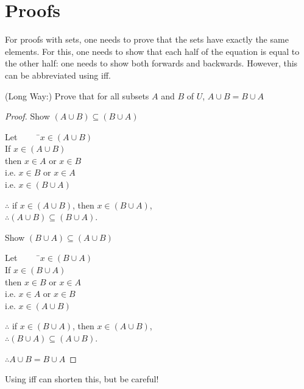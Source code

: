 \documentclass[../notes.tex]{subfiles}
\begin{document}
		\section{Proofs}
			For proofs with sets, one needs to prove that the sets have exactly the same elements. For this, one needs to show that each half of the equation is equal to the other half: one needs to show both forwards and backwards. However, this can be abbreviated using iff.
			\begin{examplebox}
				(Long Way:) Prove that for all subsets $A$ and $B$ of $U$, $A \cup B = B \cup A$
				\begin{proof}
					Show $(A \cup B) \subseteq (B \cup A)$
					\begin{tabbing}
						Let $\qquad$ \=$x \in (A \cup B)$\\
						If \>$x \in (A \cup B)$\\
						then \> $x \in A$ or $x \in B$\\
						i.e. \> $x \in B$ or $x \in A$\\
						i.e. \> $x \in (B \cup A)$
					\end{tabbing}
					$\therefore$ if $x \in (A \cup B)$, then $x \in (B \cup A)$,\\
					$\therefore (A \cup B) \subseteq (B \cup A)$.

					\vspace{7mm}
					Show $(B \cup A) \subseteq (A \cup B)$
					\begin{tabbing}
						Let $\qquad$ \=$x \in (B \cup A)$\\
						If \>$x \in (B \cup A)$\\
						then \> $x \in B$ or $x \in A$\\
						i.e. \> $x \in A$ or $x \in B$\\
						i.e. \> $x \in (A \cup B)$
					\end{tabbing}
					$\therefore$ if $x \in (B \cup A)$, then $x \in (A \cup B)$,\\
					$\therefore (B \cup A) \subseteq (A \cup B)$.
					
					\vspace{5mm}
					$\therefore A \cup B = B \cup A$
				\end{proof}
			\end{examplebox}
			Using iff can shorten this, but be careful!
\end{document}
